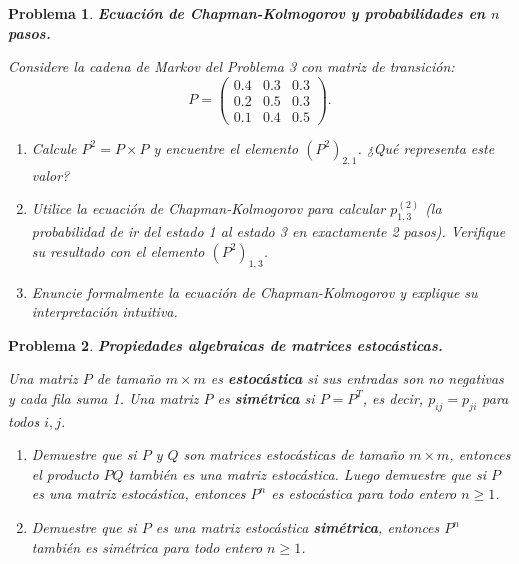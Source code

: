 \documentclass[12pt]{article}
\newtheorem{problem}{Problema}
\begin{document}
\begin{problem}
\textbf{Ecuación de Chapman-Kolmogorov y probabilidades en $n$ pasos.}

Considere la cadena de Markov del Problema 3 con matriz de transición:
\[
P = \begin{pmatrix}
0.4 & 0.3 & 0.3 \\
0.2 & 0.5 & 0.3 \\
0.1 & 0.4 & 0.5
\end{pmatrix}.
\]

\begin{enumerate}
    \item[(a)] Calcule $P^2 = P \times P$ y encuentre el elemento $(P^2)_{2,1}$. ¿Qué representa este valor?
    
    \item[(b)] Utilice la ecuación de Chapman-Kolmogorov para calcular $p_{1,3}^{(2)}$ (la probabilidad de ir del estado 1 al estado 3 en exactamente 2 pasos). Verifique su resultado con el elemento $(P^2)_{1,3}$.
    
    \item[(c)] Enuncie formalmente la ecuación de Chapman-Kolmogorov y explique su interpretación intuitiva.
\end{enumerate}
\end{problem}

\begin{problem}
\textbf{Propiedades algebraicas de matrices estocásticas.}

Una matriz $P$ de tamaño $m \times m$ es \textbf{estocástica} si sus entradas son no negativas y cada fila suma 1. Una matriz $P$ es \textbf{simétrica} si $P = P^T$, es decir, $p_{ij} = p_{ji}$ para todos $i, j$.

\begin{enumerate}
    \item[(a)] Demuestre que si $P$ y $Q$ son matrices estocásticas de tamaño $m \times m$, entonces el producto $PQ$ también es una matriz estocástica. Luego demuestre que si $P$ es una matriz estocástica, entonces $P^n$ es estocástica para todo entero $n \geq 1$.
    
    \item[(b)] Demuestre que si $P$ es una matriz estocástica \textbf{simétrica}, entonces $P^n$ también es simétrica para todo entero $n \geq 1$.
\end{enumerate}
\end{problem}
\end{document}
